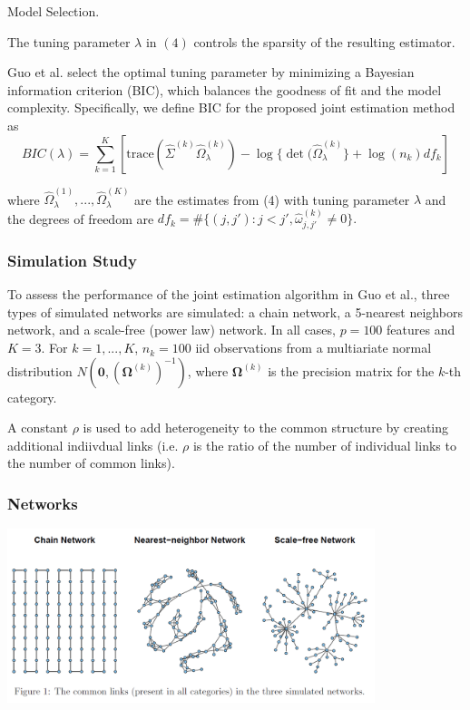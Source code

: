 \documentclass[t]{beamer}
\begin{document}
                
           \begin{frame}{Model Selection.}
            
              The tuning parameter $\lambda$ in $(4)$ controls the sparsity of the resulting estimator. 
\bigskip
\pause

Guo et al. select the optimal tuning parameter by minimizing a Bayesian information criterion (BIC), which
              balances the goodness of fit and the model complexity. Specifically, we define BIC for the
              proposed joint estimation method as
              \begin{equation*}
               BIC(\lambda) = \sum_{k=1}^K [\mbox{trace}(\hat{\Sigma}^{(k)} \hat{\Omega}_{\lambda}^{(k)}) - \log \{ \det(\hat{\Omega}_{\lambda}^{(k)} \} + \log(n_k) df_k] 
              \end{equation*}
              
              where $\hat{\Omega}_{\lambda}^{(1)},...,\hat{\Omega}_{\lambda}^{(K)}$ are the estimates from (4) with tuning parameter $\lambda$ and the degrees of
              freedom are  $df_k =  \# \{ (j,j') : j<j', \hat{\omega}_{j,j'}^{(k)} \neq 0 \}.$
              
              \end{frame}

\begin{frame}
\frametitle{Simulation Study}
To assess the performance of the joint estimation algorithm in Guo et al., three types of simulated networks are simulated: a chain network, a 5-nearest neighbors network, and a scale-free (power law) network. In all cases, $p = 100$ features and $K = 3$. For $k = 1, ..., K$, $n_k = 100$ iid observations from a multiariate normal distribution $N(\bm{0}, (\bm{\Omega}^{(k)})^{-1})$, where $\bm{\Omega}^{(k)}$ is the precision matrix for the $k$-th category.
\bigskip
\pause

A constant $\rho$ is used to add heterogeneity to the common structure by creating additional indiivdual links (i.e. $\rho$ is the ratio of the number of individual links to the number of common links).

\end{frame}

\begin{frame}
\frametitle{Networks}
\centering
\includegraphics[height=2in]{networks.png}
\end{frame}
\end{document}
